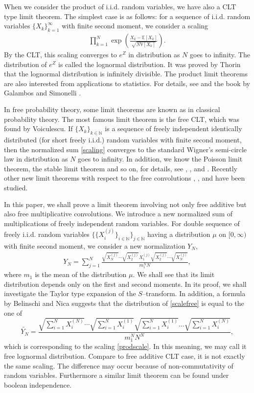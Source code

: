 \documentclass[12pt]{amsart}
\theoremstyle{definition}
\numberwithin{equation}{section}
\begin{document}
When we consider the product of i.i.d. random variables, 
we have also a CLT type limit theorem.
The simplest case is as follows:
for a sequence of i.i.d. random variables $\{X_{k}\}_{k=1}^{\infty}$ with finite second moment,
we consider a scaling
\begin{align}\label{prodscale}
\prod_{k=1}^{N}\exp\left( 
\frac{X_{k}-\mathbb{E}[X_{k}]}{\sqrt{N\mathbb{V}[X_{k}]}} 
\right).
\end{align}
By the CLT, this scaling converges to $e^{Z}$ in distribution as $N$ goes to infinity.
The distribution of $e^{Z}$ is called the lognormal distribution.
It was proved by Thorin \cite{Th77b} that the lognormal distribution is infinitely divisible.
The product limit theorems are also interested from applications to statistics. 
For details, see \cite{ReWe02} and the book by Galambos and Simonelli \cite{Gala04}. 

In free probability theory, 
some limit theorems are known as in classical probability theory.
The most famous limit theorem is the free CLT,
which was found by Voiculescu.
If $\{X_k\}_{k\in {\mathbb{N}}}$ is a sequence of freely independent identically distributed 
(for short freely i.i.d.) random variables with finite second moment,
then the normalized sum
\eqref{scaling} 
converges to the standard Wigner's semi-circle law in distribution as $N$ goes 
to infinity.
In addition, we know the Poisson limit theorem, the stable limit theorem and so on,
for details, see \cite{HiPe00}, \cite{BeVo93}, and \cite{BePa99}. 
Recently other new limit theorems with respect to the free convolutions \cite{BeWa08}, \cite{Wa10}, and \cite{Tu10} have been studied. 

In this paper, we shall prove a limit theorem involving not only free additive 
but also free multiplicative convolutions.
We introduce a new normalized sum of multiplications of freely independent random variables.
For double sequence of freely i.i.d. random variables 
$\{\{X^{(j)}_{i}\}_{i\in{\mathbb{N}}}\}_{j\in{\mathbb{N}}}$ having a distribution $\mu$ on $[0,\infty)$
with finite second moment,
we consider a new normalization $Y_{N}$,
	\begin{align}\label{scalefree}
	&Y_{N}=\sum_{j=1}^{N}\frac{
	\sqrt{X^{(j)}_{N}} \cdots 
	\sqrt{X^{(j)}_{2}}
	X^{(j)}_{1}
	\sqrt{X^{(j)}_{2}}
	\cdots 
	\sqrt{X^{(j)}_{N}}}
	{m_{1}^{N}N},&
	\end{align}
where $m_{1}$ is the mean of the distribution $\mu$.
We shall see that
its limit distribution depends only on the first and second moments.
In its proof,
we shall investigate the Taylor type expansion of 
the $S$--transform.
In addition, a formula by Belinschi and Nica \cite{BeNi09} suggests that
the distribution of \eqref{scalefree} is equal to  the one of
$$
\widetilde{Y_{N}} = \frac{\sqrt{\sum_{i=1}^{N}X^{(N)}_{i}}\cdots\sqrt{\sum_{i=1}^{N}X^{(1)}_{i}}\sqrt{\sum_{i=1}^{N}X^{(1)}_{i}}\dots\sqrt{\sum_{i=1}^{N}X^{(N)}_{i}}}{m_{1}^{N}N^{N}},
$$
which is corresponding to the scaling \eqref{prodscale}. 
In this meaning, we may call it free lognormal distribution.
Compare to free additive CLT case, it is not exactly the same scaling. 
The difference may occur because of non-commutativity of random variables.
Furthermore a similar limit theorem can be found under boolean independence.
\end{document}
